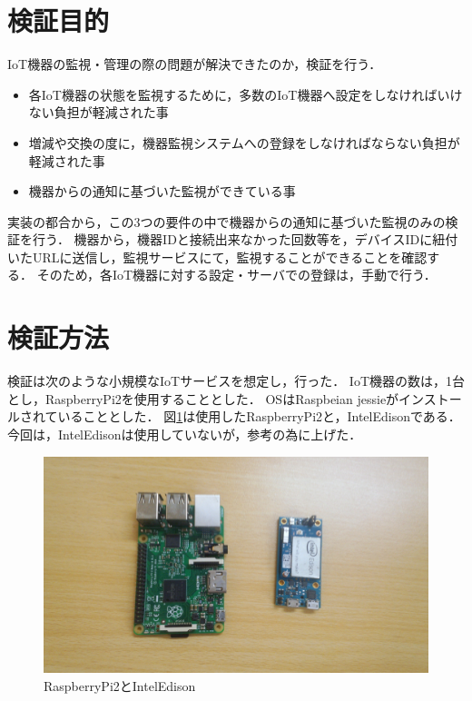 \section{検証目的}
IoT機器の監視・管理の際の問題が解決できたのか，検証を行う．
\begin{itemize}
\item 各IoT機器の状態を監視するために，多数のIoT機器へ設定をしなければいけない負担が軽減された事
\item 増減や交換の度に，機器監視システムへの登録をしなければならない負担が軽減された事
\item 機器からの通知に基づいた監視ができている事
\end{itemize}

実装の都合から，この3つの要件の中で機器からの通知に基づいた監視のみの検証を行う．
機器から，機器IDと接続出来なかった回数等を，デバイスIDに紐付いたURLに送信し，監視サービスにて，監視することができることを確認する．
そのため，各IoT機器に対する設定・サーバでの登録は，手動で行う．

\section{検証方法}
検証は次のような小規模なIoTサービスを想定し，行った．
IoT機器の数は，1台とし，RaspberryPi2を使用することとした．
OSはRaspbeian jessieがインストールされていることとした．
図\ref{fig:device}は使用したRaspberryPi2と，IntelEdisonである．
今回は，IntelEdisonは使用していないが，参考の為に上げた．
\begin{figure}[htbp]
\begin{center}
\includegraphics[width=14cm]{images/device.png}
\caption{RaspberryPi2とIntelEdison}
\label{fig:device}
\end{center}
\end{figure}

